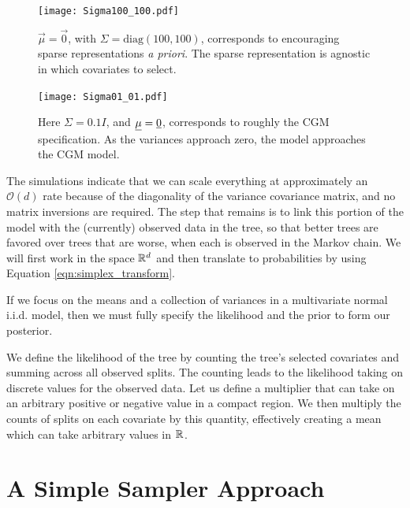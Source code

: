  \begin{figure}[ht]
\begin{minipage}[b]{0.45\linewidth}
\centering
\texttt{[image: Sigma100\_100.pdf]}
\caption[ALN plot with a zero vector mean and $\Sigma=\text{Diag}(100,100)$]{$\vec{\mu}=\vec{0}$, with
 $\Sigma= \text{diag}(100, 100)$, corresponds to encouraging sparse representations \emph{a priori}. The sparse representation is agnostic in which covariates to select.  }
\label{fig:figure7}
\end{minipage}
\hspace{0.5cm}
\begin{minipage}[b]{0.45\linewidth}
\centering
\texttt{[image: Sigma01\_01.pdf]}
\caption[ALN plot approximating the CGM model]{Here $\Sigma=0.1I$, and $\underline{\mu}=\underline{{0}}$, corresponds to roughly the CGM specification. As the variances approach zero, the model approaches the CGM model.}
\label{fig:figure8}
\end{minipage}
\end{figure}

 The simulations indicate that we can scale everything at approximately an $\mathcal{O}(d)$ rate because of the diagonality of the variance covariance matrix, and no matrix inversions are required. The step that remains is to link this portion of the model with the (currently) observed data in the tree, so that better trees are favored over trees that are worse, when each is observed in the Markov chain. We will first work in the space $\mathbb{R}^{d}$ and then translate to probabilities by using Equation \ref{eqn:simplex_transform}.  
 
 If we focus on the means and a collection of variances in a multivariate normal i.i.d. model, then we must fully specify the likelihood and the prior to form our posterior. 
 
We define the likelihood of the tree by counting the tree's selected covariates and summing across all observed splits. The counting leads to the likelihood taking on discrete values for the observed data. Let us define a multiplier that can take on an arbitrary positive or negative value in a compact region. We then multiply the counts of splits on each covariate by this quantity, effectively creating a mean which can take arbitrary values in $\mathbb{R}^{}$. 

\section{A Simple Sampler Approach}\label{subsec:simple_sampler}

